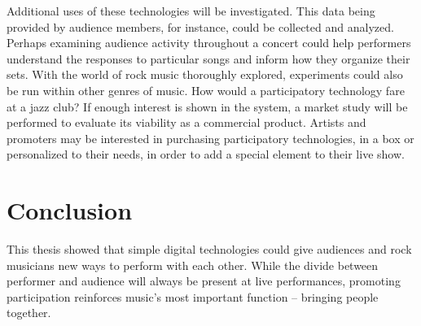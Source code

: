 Additional uses of these technologies will be investigated. This data being provided by audience members, for instance, could be collected and analyzed. Perhaps examining audience activity throughout a concert could help performers understand the responses to particular songs and inform how they organize their sets. With the world of rock music thoroughly explored, experiments could also be run within other genres of music. How would a participatory technology fare at a jazz club? If enough interest is shown in the system, a market study will be performed to evaluate its viability as a commercial product. Artists and promoters may be interested in purchasing participatory technologies, in a box or personalized to their needs, in order to add a special element to their live show.


\section{Conclusion}

This thesis showed that simple digital technologies could give audiences and rock musicians new ways to perform with each other. While the divide between performer and audience will always be present at live performances, promoting participation reinforces music's most important function -- bringing people together.
